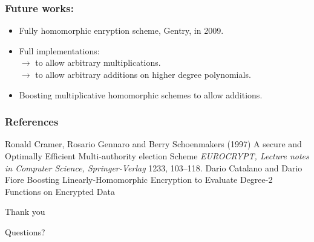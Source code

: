 \documentclass{beamer}
\begin{document}
\begin{frame}[t]
\frametitle{Future works:}

\begin{itemize}
\item Fully homomorphic enryption scheme, Gentry, in 2009. \\
\vspace*{2mm}
\item Full implementations: \\
\vspace*{2mm}
$\rightarrow$ to allow arbitrary multiplications.\\
\vspace*{2mm}
$\rightarrow$ to allow arbitrary additions on higher degree polynomials.
\vspace*{3mm}
\item Boosting multiplicative homomorphic schemes to allow additions.

\end{itemize}
\end{frame}



\begin{frame}[t]
\frametitle{References}
\footnotesize{
\begin{thebibliography}{99} %
 Ronald Cramer, Rosario Gennaro and Berry Schoenmakers (1997)
\newblock A secure and Optimally Efficient Multi-authority election Scheme
\newblock \emph{EUROCRYPT, Lecture notes in Computer Science, Springer-Verlag} 1233, 103--118.
\vspace*{3mm}
 Dario Catalano and Dario Fiore
\newblock Boosting Linearly-Homomorphic Encryption to Evaluate Degree-2 Functions on Encrypted Data
\end{thebibliography}
}
\end{frame}


\begin{frame}
\Huge{\centerline{Thank you}}
\end{frame}

\begin{frame}
\Huge{\centerline{Questions?}}
\end{frame}

\end{document}
